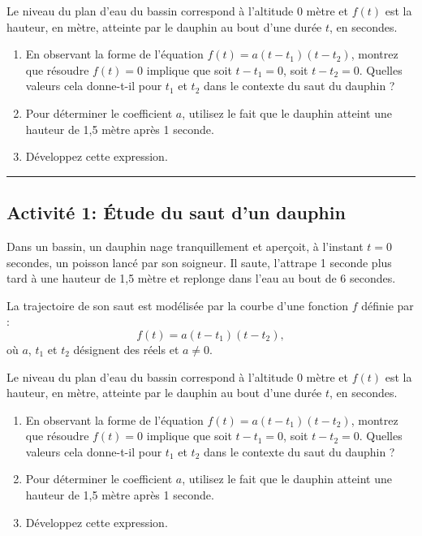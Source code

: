 \documentclass{article}
\begin{document}
Le niveau du plan d’eau du bassin correspond à l’altitude 0 mètre et $f(t)$ est la hauteur, en mètre, atteinte par le dauphin au bout d’une durée $t$, en secondes.

\begin{enumerate}
    \item En observant la forme de l'équation $f(t) = a (t - t_1)(t - t_2)$, montrez que résoudre $f(t) = 0$ implique que soit $t - t_1 = 0$, soit $t - t_2 = 0$. Quelles valeurs cela donne-t-il pour $t_1$ et $t_2$ dans le contexte du saut du dauphin ?

    \item Pour déterminer le coefficient $a$, utilisez le fait que le dauphin atteint une hauteur de 1,5 mètre après 1 seconde.

    \item Développez cette expression.
\end{enumerate}


\hrule

\begin{center}
\section*{Activité 1: Étude du saut d'un dauphin}
\end{center}

Dans un bassin, un dauphin nage tranquillement et aperçoit, à l’instant $t = 0$ secondes, un poisson lancé par son soigneur. Il saute, l’attrape 1 seconde plus tard à une hauteur de 1,5 mètre et replonge dans l’eau au bout de 6 secondes.

La trajectoire de son saut est modélisée par la courbe d'une fonction $f$ définie par :
$$
f(t) = a (t - t_1)(t - t_2),
$$
où $a$, $t_1$ et $t_2$ désignent des réels et $a \neq 0$.

Le niveau du plan d’eau du bassin correspond à l’altitude 0 mètre et $f(t)$ est la hauteur, en mètre, atteinte par le dauphin au bout d’une durée $t$, en secondes.

\begin{enumerate}
    \item En observant la forme de l'équation $f(t) = a (t - t_1)(t - t_2)$, montrez que résoudre $f(t) = 0$ implique que soit $t - t_1 = 0$, soit $t - t_2 = 0$. Quelles valeurs cela donne-t-il pour $t_1$ et $t_2$ dans le contexte du saut du dauphin ?

    \item Pour déterminer le coefficient $a$, utilisez le fait que le dauphin atteint une hauteur de 1,5 mètre après 1 seconde.

    \item Développez cette expression.
\end{enumerate}
\end{document}
